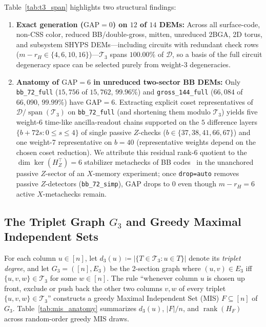 \documentclass[12pt]{article}
\theoremstyle{definition}
\DeclareMathOperator{\rank}{rank}
\newcommand{\Dc}{\mathcal{D}}
\newcommand{\Tc}{\mathcal{T}_3}
\newcommand{\ttt}[1]{\texttt{#1}}
\begin{document}
Table~\ref{tab:t3_span} highlights two structural findings:
\begin{enumerate}[label=(\arabic*)]
  \item \textbf{Exact generation ($\mathrm{GAP} = 0$) on $12$ of $14$ DEMs:} Across all surface-code, non-CSS color,
    reduced BB/double-gross, mitten, unreduced 2BGA, 2D torus, and subsystem SHYPS DEMs---including circuits with
    redundant check rows ($m - r_H \in \{4, 6, 10, 16\}$)---$\Tc$ spans $100.00\%$ of $\Dc$, so a basis of the full
    circuit degeneracy space can be selected purely from weight-3 degeneracies.
  \item \textbf{Anatomy of $\mathrm{GAP} = 6$ in unreduced two-sector BB DEMs:} Only \ttt{bb\_72\_full} ($15{,}756$
    of $15{,}762$, $99.96\%$) and \ttt{gross\_144\_full} ($66{,}084$ of $66{,}090$, $99.99\%$) have $\mathrm{GAP} =
    6$. Extracting explicit coset representatives of $\Dc / \operatorname{span}(\Tc)$ on \ttt{bb\_72\_full} (and
    shortening them modulo $\Tc$) yields five weight-6 time-like ancilla-readout chains supported on the $5$
    difference layers $\{b + 72 s : 0 \le s \le 4\}$ of single passive $Z$-checks ($b \in \{37, 38, 41, 66, 67\}$)
    and one weight-7 representative on $b = 40$ (representative weights depend on the chosen coset reduction). We
    attribute this residual rank-$6$ quotient to the $\dim \ker(H_Z^\top) = 6$ stabilizer metachecks of BB
    codes~\cite{BravyiCrossGambettaMaslovRallYoder2024} in the unanchored passive $Z$-sector of an $X$-memory
    experiment; once \ttt{drop=auto} removes passive $Z$-detectors (\ttt{bb\_72\_simp}), $\mathrm{GAP}$ drops to
    $0$ even though $m - r_H = 6$ active $X$-metachecks remain.
\end{enumerate}

\subsection{The Triplet Graph \texorpdfstring{$G_3$}{G3} and Greedy Maximal Independent
  Sets}\label{subsec:triplet_graph}

For each column $u \in [n]$, let $d_3(u) \coloneqq |\{T \in \Tc : u \in T\}|$ denote its \emph{triplet degree}, and
let $G_3 = ([n], E_3)$ be the 2-section graph where $(u, v) \in E_3$ iff $\{u, v, w\} \in \Tc$ for some $w \in
[n]$. The rule ``whenever column $u$ is chosen up front, exclude or push back the other two columns $v, w$ of every
triplet $\{u, v, w\} \in \Tc$'' constructs a greedy Maximal Independent Set (MIS) $F \subseteq [n]$ of $G_3$.
Table~\ref{tab:mis_anatomy} summarizes $d_3(u)$, $|F|/n$, and $\rank(H_F)$ across random-order greedy MIS draws.
\end{document}
